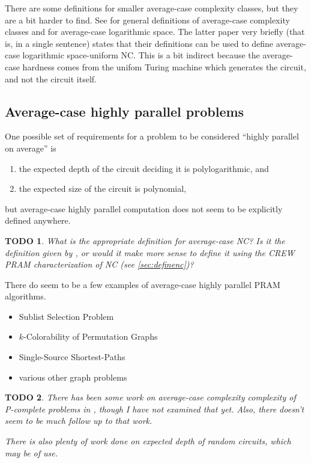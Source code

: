 \documentclass{article}
\newtheorem{todo}{TODO}
\begin{document}
There are some definitions for smaller average-case complexity classes, but they are a bit harder to find.
See \cite[Section~3.5.1]{yamakami97} for general definitions of average-case complexity classes and \cite[Section~7]{bcgl89} for average-case logarithmic space.
The latter paper very briefly (that is, in a single sentence) states that their definitions can be used to define average-case logarithmic space-uniform \textsf{NC}.
This is a bit indirect because the average-case hardness comes from the unifom Turing machine which generates the circuit, and not the circuit itself.

\subsection{Average-case highly parallel problems}

One possible set of requirements for a problem to be considered ``highly parallel on average'' is
\begin{enumerate}
  \item the expected depth of the circuit deciding it is polylogarithmic, and
  \item the expected size of the circuit is polynomial,
\end{enumerate}
but average-case highly parallel computation does not seem to be explicitly defined anywhere.

\begin{todo}
  What is the appropriate definition for average-case \textsl{\textsf{NC}}?
  Is it the definition given by \cite{bcgl89}, or would it make more sense to define it using the CREW PRAM characterization of \textsl{\textsf{NC}}{} (see \autoref{sec:definenc})?
\end{todo}

There do seem to be a few examples of average-case highly parallel PRAM algorithms.
\begin{itemize}
\item Sublist Selection Problem \cite{pz91}
\item $k$-Colorability of Permutation Graphs \cite{an99}
\item Single-Source Shortest-Paths \cite{meyer02}
\item various other graph problems \cite{rs92}
\end{itemize}

\begin{todo}
  There has been some work on average-case complexity complexity of \textsl{\textsf{P}}-complete problems in \cite{sx99}, though I have not examined that yet.
  Also, there doesn't seem to be much follow up to that work.

  There is also plenty of work done on expected depth of random circuits, which may be of use.
\end{todo}
\end{document}
